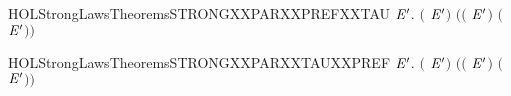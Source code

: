 \newcommand{\HOLStrongLawsTheoremsSTRONGXXPARXXPREFXXSYNCR}{\UseVerbatim{HOLStrongLawsTheoremsSTRONGXXPARXXPREFXXSYNCR}}
\begin{SaveVerbatim}{HOLStrongLawsTheoremsSTRONGXXPARXXPREFXXTAU}
\HOLTokenTurnstile{} \HOLSymConst{\HOLTokenForall{}}  \ensuremath{\HOLBoundVar{E}\sp{\prime{}}}.
      \ensuremath{(}\HOLSymConst{\ensuremath{\ldotp}} \HOLSymConst{\ensuremath{\mid}} \HOLConst{\ensuremath{\tau}}\HOLSymConst{\ensuremath{\ldotp}}\ensuremath{\HOLBoundVar{E}\sp{\prime{}}}\ensuremath{)} \ensuremath{(}\HOLSymConst{\ensuremath{\ldotp}}\ensuremath{(} \HOLSymConst{\ensuremath{\mid}} \HOLConst{\ensuremath{\tau}}\HOLSymConst{\ensuremath{\ldotp}}\ensuremath{\HOLBoundVar{E}\sp{\prime{}}}\ensuremath{)} \HOLSymConst{\ensuremath{+}} \HOLConst{\ensuremath{\tau}}\HOLSymConst{\ensuremath{\ldotp}}\ensuremath{(}\HOLSymConst{\ensuremath{\ldotp}} \HOLSymConst{\ensuremath{\mid}} \ensuremath{\HOLBoundVar{E}\sp{\prime{}}}\ensuremath{)}\ensuremath{)}
\end{SaveVerbatim}
\newcommand{\HOLStrongLawsTheoremsSTRONGXXPARXXPREFXXTAU}{\UseVerbatim{HOLStrongLawsTheoremsSTRONGXXPARXXPREFXXTAU}}
\begin{SaveVerbatim}{HOLStrongLawsTheoremsSTRONGXXPARXXTAUXXPREF}
\HOLTokenTurnstile{} \HOLSymConst{\HOLTokenForall{}}  \ensuremath{\HOLBoundVar{E}\sp{\prime{}}}.
      \ensuremath{(}\HOLConst{\ensuremath{\tau}}\HOLSymConst{\ensuremath{\ldotp}} \HOLSymConst{\ensuremath{\mid}} \HOLSymConst{\ensuremath{\ldotp}}\ensuremath{\HOLBoundVar{E}\sp{\prime{}}}\ensuremath{)} \ensuremath{(}\HOLConst{\ensuremath{\tau}}\HOLSymConst{\ensuremath{\ldotp}}\ensuremath{(} \HOLSymConst{\ensuremath{\mid}} \HOLSymConst{\ensuremath{\ldotp}}\ensuremath{\HOLBoundVar{E}\sp{\prime{}}}\ensuremath{)} \HOLSymConst{\ensuremath{+}} \HOLSymConst{\ensuremath{\ldotp}}\ensuremath{(}\HOLConst{\ensuremath{\tau}}\HOLSymConst{\ensuremath{\ldotp}} \HOLSymConst{\ensuremath{\mid}} \ensuremath{\HOLBoundVar{E}\sp{\prime{}}}\ensuremath{)}\ensuremath{)}
\end{SaveVerbatim}
\newcommand{\HOLStrongLawsTheoremsSTRONGXXPARXXTAUXXPREF}{\UseVerbatim{HOLStrongLawsTheoremsSTRONGXXPARXXTAUXXPREF}}
